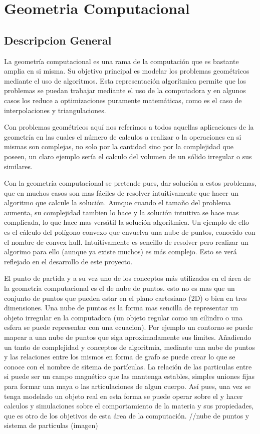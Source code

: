 \documentclass[final, 12pt letterpaper]{article}
\begin{document}
\section{Geometria Computacional}
\subsection{Descripcion General}

La geometría computacional es una rama de la computación que es bastante amplia en si misma. Su objetivo principal es modelar los problemas geométricos mediante el uso de algoritmos. Esta representación algorítmica permite que los problemas se puedan trabajar mediante el uso de la computadora y en algunos casos los reduce a optimizaciones puramente matemáticas, como es el caso de interpolaciones y triangulaciones.\medskip

Con problemas geométricos aquí nos referimos a todos aquellas aplicaciones de la geometría en las cuales el número de calculos a realizar o la operaciones en si mismas son complejas, no solo por la cantidad sino por la complejidad que poseen, un claro ejemplo sería el calculo del  volumen de un sólido irregular o sus similares.\medskip

Con la geometría computacional se pretende pues, dar solución a estos problemas, que en muchos casos son mas fáciles de resolver intuitivamente que hacer un algoritmo que calcule la solución. Aunque cuando el tamaño del problema aumenta, su complejidad tambien lo hace y la solución intuitiva se hace mas complicada, lo que hace mas versátil la solución algorítmica. Un ejemplo de ello es el cálculo del polígono convexo que envuelva una nube de puntos, conocido con el nombre de convex hull. Intuitivamente es sencillo de resolver pero realizar un algorimo para ello (aunque ya existe muchos) es más complejo. Esto se verá reflejado en el desarrollo de este proyecto.\medskip

El punto de partida y a su vez uno de los conceptos más utilizados en el área de la geometria computacional es el de nube de puntos. esto no es mas que un conjunto de puntos que pueden estar en el plano cartesiano (2D) o bien en tres dimensiones. Una nube de puntos es la forma mas sencilla de representar un objeto irregular en la computadora (un objeto regular como un cilindro o una esfera se puede representar con una ecuacion). Por ejemplo un contorno se puede mapear a una nube de puntos que siga aproximadamente sus limites. Añadiendo un tanto de complejidad y conceptos de algoritmia, mediante una nube de puntos y las relaciones entre los mismos en forma de grafo se puede crear lo que se conoce con el nombre de sitema de partículas. La relación de las particulas entre si puede ser un campo magnético que las mantenga estables, simples uniones fijas para formar una maya o las articulaciones de algun cuerpo. Así pues, una vez se tenga modelado un objeto real en esta forma se puede operar sobre el y hacer calculos y simulaciones sobre el comportamiento de la materia y sus propiedades, que es otro de los objetivos de esta área de la computación.\vspace*{0.2in}
//nube de puntos y sistema de particulas (imagen)\vspace*{0.2in}
\end{document}
